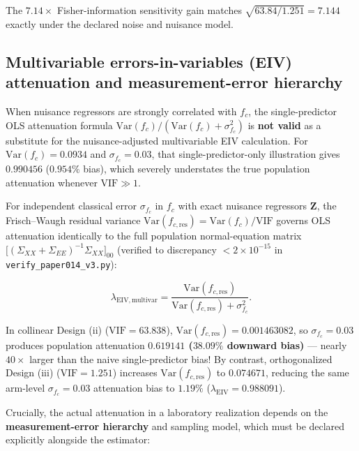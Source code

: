 \documentclass[
  american,
  11pt,
  letterpaper,
]{article}
\begin{document}
The \(7.14\times\) Fisher-information sensitivity gain matches \(\sqrt{63.84 / 1.251} = 7.144\) exactly under the declared noise and nuisance model.

\subsection{Multivariable errors-in-variables (EIV) attenuation and measurement-error hierarchy}\label{multivariable-errors-in-variables-eiv-attenuation-and-measurement-error-hierarchy}

When nuisance regressors are strongly correlated with \(f_c\), the single-predictor OLS attenuation formula \(\mathrm{Var}(f_c)/(\mathrm{Var}(f_c) + \sigma_{f_c}^2)\) is \textbf{not valid} as a substitute for the nuisance-adjusted multivariable EIV calculation. For \(\mathrm{Var}(f_c) = 0.0934\) and \(\sigma_{f_c} = 0.03\), that single-predictor-only illustration gives \(0.990456\) (\(0.954\%\) bias), which severely understates the true population attenuation whenever \(\mathrm{VIF} \gg 1\).

For independent classical error \(\sigma_{f_c}\) in \(f_c\) with exact nuisance regressors \(\mathbf{Z}\), the Frisch--Waugh residual variance \(\mathrm{Var}(f_{c,\mathrm{res}}) = \mathrm{Var}(f_c)/\mathrm{VIF}\) governs OLS attenuation identically to the full population normal-equation matrix \(\bigl[(\Sigma_{XX} + \Sigma_{EE})^{-1}\Sigma_{XX}\bigr]_{00}\) (verified to discrepancy \(< 2 \times 10^{-15}\) in \nolinkurl{verify_paper014_v3.py}):

\begin{equation}
\lambda_{\mathrm{EIV,multivar}} = \frac{\mathrm{Var}(f_{c,\mathrm{res}})}{\mathrm{Var}(f_{c,\mathrm{res}}) + \sigma_{f_c}^2}.
\end{equation}

In collinear Design (ii) (\(\mathrm{VIF} = 63.838\)), \(\mathrm{Var}(f_{c,\mathrm{res}}) = 0.001463082\), so \(\sigma_{f_c} = 0.03\) produces population attenuation \textbf{\(0.619141\) (\(38.09\%\) downward bias)} --- nearly \(40\times\) larger than the naive single-predictor bias! By contrast, orthogonalized Design (iii) (\(\mathrm{VIF} = 1.251\)) increases \(\mathrm{Var}(f_{c,\mathrm{res}})\) to \(0.074671\), reducing the same arm-level \(\sigma_{f_c} = 0.03\) attenuation bias to \textbf{\(1.19\%\)} (\(\lambda_{\mathrm{EIV}} = 0.988091\)).

Crucially, the actual attenuation in a laboratory realization depends on the \textbf{measurement-error hierarchy} and sampling model, which must be declared explicitly alongside the estimator:
\end{document}
